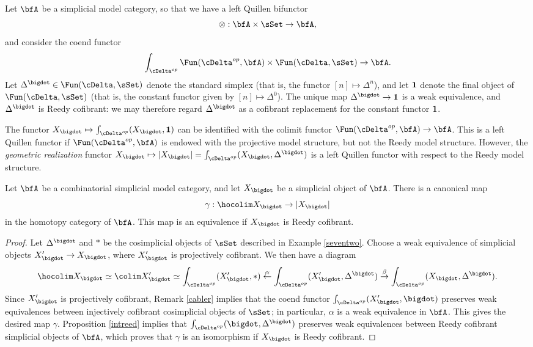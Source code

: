 \begin{Model Categories}
\begin{Didn't Read}
\begin{example}\label{seventwo}
Let $\bfA$ be a simplicial model category, so that we have a left Quillen bifunctor
$$ \otimes: \bfA \times \sSet \rightarrow \bfA,$$
and consider the coend functor
$$ \int_{ \cDelta^{op} } \Fun( \cDelta^{op}, \bfA) \times \Fun( \cDelta, \sSet) \rightarrow \bfA.$$
Let $\Delta^{\bigdot} \in \Fun( \cDelta, \sSet)$ denote the standard simplex
(that is, the functor $[n] \mapsto \Delta^n$), and let ${\bf 1}$ denote the final object
of $\Fun(\cDelta, \sSet)$ (that is, the constant functor given by $[n] \mapsto \Delta^0$).
The unique map $\Delta^{\bigdot} \rightarrow {\bf 1}$ is a weak equivalence, 
and $\Delta^{\bigdot}$ is Reedy cofibrant: we may therefore regard $\Delta^{\bigdot}$ as a cofibrant replacement for the constant functor ${\bf 1}$.

The functor $X_{\bigdot} \mapsto \int_{ \cDelta^{op}}(X_{\bigdot}, {\bf 1})$ can be identified with the colimit functor $\Fun( \cDelta^{op}, \bfA) \rightarrow \bfA$. This is a left Quillen functor if
$\Fun( \cDelta^{op}, \bfA)$ is endowed with the projective model structure, but not the Reedy model structure. However, the {\it geometric realization} functor $X_{\bigdot} \mapsto |X_{\bigdot} | = \int_{ \cDelta^{op}}(X_{\bigdot}, \Delta^{\bigdot})$ is a left Quillen functor with respect to the Reedy model structure. 
\end{example}

\begin{corollary}\label{twinner}
Let $\bfA$ be a combinatorial simplicial model category, and let $X_{\bigdot}$ be a simplicial object
of $\bfA$. There is a canonical map
$$ \gamma: \hocolim X_{\bigdot} \rightarrow | X_{\bigdot} |$$
in the homotopy category of $\bfA$. This map is an equivalence if $X_{\bigdot}$ is Reedy cofibrant.
\end{corollary}

\begin{proof}
Let $\Delta^{\bigdot}$ and $\ast$ be the cosimplicial objects of $\sSet$ described in Example
\ref{seventwo}. Choose a weak equivalence of simplicial objects $X'_{\bigdot} \rightarrow X_{\bigdot}$, where $X'_{\bigdot}$ is projectively cofibrant. We then have a diagram
$$ \hocolim X_{\bigdot} \simeq \colim X'_{\bigdot}
\simeq \int_{ \cDelta^{op}}(X'_{\bigdot}, \ast)
\stackrel{\alpha}{\leftarrow} \int_{ \cDelta^{op}}( X'_{\bigdot}, \Delta^{\bigdot})
\stackrel{\beta}{\rightarrow} \int_{ \cDelta^{op}}( X_{\bigdot}, \Delta^{\bigdot}).$$
Since $X'_{\bigdot}$ is projectively cofibrant, Remark \ref{cabler} implies that the 
coend functor $\int_{\cDelta^{op}}( X'_{\bigdot}, \bigdot)$ preserves weak equivalences between
injectively cofibrant cosimplicial objects of $\sSet$; in particular, $\alpha$ is a weak equivalence in $\bfA$. This gives the desired map $\gamma$. Proposition \ref{intreed} implies that $\int_{ \cDelta^{op}}( \bigdot, \Delta^{\bigdot})$ preserves weak equivalences between Reedy cofibrant simplicial objects of $\bfA$, which proves that $\gamma$ is an isomorphism if $X_{\bigdot}$ is Reedy cofibrant.
\end{proof}


\end{Didn't Read}
\end{Model Categories}
